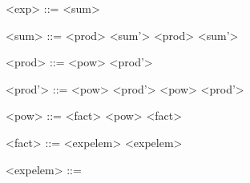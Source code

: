 \begin{grammarEx}
	<exp> ::= <sum>
	
	<sum> ::= \lit{\opplus{}} <prod> <sum'>
	\alt \lit{\opminus{}} <prod> <sum'>
	\alt \textemptyword{}

	<prod> ::= <pow> <prod'>
	
	<prod'> ::= \lit{\opmult{}} <pow> <prod'>
	\alt \lit{/} <pow> <prod'>
	\alt \textemptyword{}

	<pow> ::= <fact> \lit{\oppow{}} <pow>
	\alt <fact>

	<fact> ::= <exp\textunderscore elem> \lit{!}
	\alt <exp\textunderscore elem>

	<exp\textunderscore elem> ::= 
	\alt {}
\end{grammarEx}